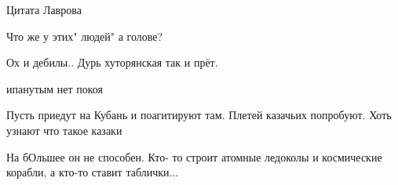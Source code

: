 \begin{itemize}
 
Цитата Лаврова

 
Что же у этих" людей" а голове?

 
Ох и дебилы.. Дурь хуторянская так и прёт.

 
ипанутым нет покоя

 
Пусть приедут на Кубань и поагитируют там. Плетей казачьих попробуют. Хоть узнают что такое казаки🤣

 
На бОльшее он не способен. Кто- то строит атомные ледоколы и космические корабли, а кто-то ставит таблички...

 

\end{itemize}
